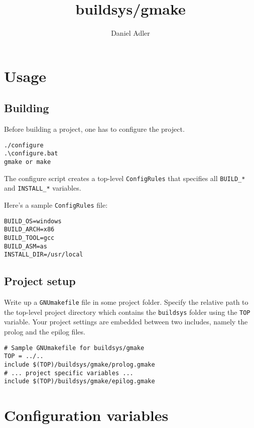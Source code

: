 \documentclass{article}
\newcommand{\var}[1]{{\tt #1}}
\newcommand{\file}[1]{{\tt #1}}
\begin{document}
\title{buildsys/gmake}
\author{Daniel Adler}
\maketitle

\section{Usage}

\subsection{Building}

Before building a project, one has to configure the project.

\begin{verbatim}
./configure
.\configure.bat
gmake or make
\end{verbatim}

The configure script creates a top-level \file{ConfigRules} that
specifies all \var{BUILD\_*} and \var{INSTALL\_*} variables.

Here's a sample \file{ConfigRules} file:

\begin{verbatim}
BUILD_OS=windows
BUILD_ARCH=x86
BUILD_TOOL=gcc
BUILD_ASM=as
INSTALL_DIR=/usr/local
\end{verbatim}

\subsection{Project setup}

Write up a \file{GNUmakefile} file in some project folder. Specify the
relative path to the top-level project directory which contains the \file{buildsys} folder
using the \var{TOP} variable. Your project settings are embedded between
two includes, namely the prolog and the epilog files.

\begin{verbatim}
# Sample GNUmakefile for buildsys/gmake
TOP	= ../..
include $(TOP)/buildsys/gmake/prolog.gmake
# ... project specific variables ...
include $(TOP)/buildsys/gmake/epilog.gmake
\end{verbatim}

\section{Configuration variables}
  
\end{document}
